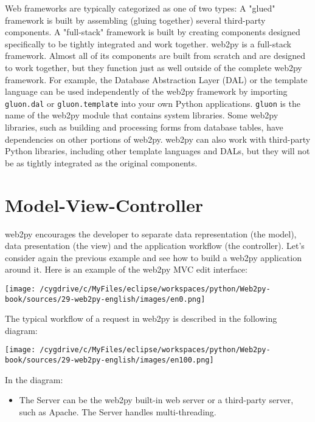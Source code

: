 \documentclass[justified,sixbynine,notoc]{tufte-book}
\def\ft{\small\tt}
\def\inxx#1{\index{#1}}
\begin{document}
\begin{fullwidth}
Web frameworks are typically categorized as one of two types: A "glued" framework is
built by assembling (gluing together) several third-party components. A "full-stack" framework is built
by creating components designed specifically to be tightly integrated and work together.
\noindent web2py is a full-stack framework. Almost all of its components are built from scratch and are designed to work
together, but they function just as well outside of the complete web2py framework. For example, the
Database Abstraction Layer (DAL) or the template language can be used independently of the
web2py framework by importing {\ft gluon.dal} or {\ft gluon.template} into your own Python applications. {\ft gluon} is the name of the web2py module that contains system libraries. Some web2py libraries,
such as building and processing forms from database tables, have dependencies on other portions
of web2py. web2py can also work with third-party Python libraries, including other template languages
and DALs, but they will not be as tightly integrated as the original components.

\goodbreak\section{Model-View-Controller}

\inxx{Model-View-Controller}
web2py encourages the developer to separate data representation (the model), data
presentation (the view) and the application workflow (the controller). Let's consider again the previous example
and see how to build a web2py application around it. Here is an example of the web2py MVC edit interface:


\goodbreak\begin{center}\texttt{[image: /cygdrive/c/MyFiles/eclipse/workspaces/python/Web2py-book/sources/29-web2py-english/images/en0.png]}\end{center}


The typical workflow of a request in web2py is described in the following diagram:


\goodbreak\begin{center}\texttt{[image: /cygdrive/c/MyFiles/eclipse/workspaces/python/Web2py-book/sources/29-web2py-english/images/en100.png]}\end{center}


In the diagram:
\begin{itemize}
\item The Server can be the web2py built-in web server or a third-party server, such as Apache. The Server handles multi-threading.


\end{itemize}
\end{fullwidth}
\end{document}
